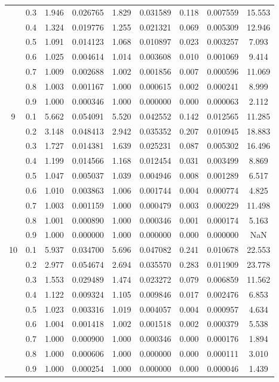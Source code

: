 \begin{longtable}{ | c | c || c | c | c | c | c | c | c | }
 & 0.3 & 1.946 & 0.026765 & 1.829 & 0.031589 & 0.118 & 0.007559 & 15.553 \\
 & 0.4 & 1.324 & 0.019776 & 1.255 & 0.021321 & 0.069 & 0.005309 & 12.946 \\
 & 0.5 & 1.091 & 0.014123 & 1.068 & 0.010897 & 0.023 & 0.003257 & 7.093 \\
 & 0.6 & 1.025 & 0.004614 & 1.014 & 0.003608 & 0.010 & 0.001069 & 9.414 \\
 & 0.7 & 1.009 & 0.002688 & 1.002 & 0.001856 & 0.007 & 0.000596 & 11.069 \\
 & 0.8 & 1.003 & 0.001167 & 1.000 & 0.000615 & 0.002 & 0.000241 & 8.999 \\
 & 0.9 & 1.000 & 0.000346 & 1.000 & 0.000000 & 0.000 & 0.000063 & 2.112 \\
 \hline
\multirow{9}{*}{9} & 0.1 & 5.662 & 0.054091 & 5.520 & 0.042552 & 0.142 & 0.012565 & 11.285 \\
 & 0.2 & 3.148 & 0.048413 & 2.942 & 0.035352 & 0.207 & 0.010945 & 18.883 \\
 & 0.3 & 1.727 & 0.014381 & 1.639 & 0.025231 & 0.087 & 0.005302 & 16.496 \\
 & 0.4 & 1.199 & 0.014566 & 1.168 & 0.012454 & 0.031 & 0.003499 & 8.869 \\
 & 0.5 & 1.047 & 0.005037 & 1.039 & 0.004946 & 0.008 & 0.001289 & 6.517 \\
 & 0.6 & 1.010 & 0.003863 & 1.006 & 0.001744 & 0.004 & 0.000774 & 4.825 \\
 & 0.7 & 1.003 & 0.001159 & 1.000 & 0.000479 & 0.003 & 0.000229 & 11.498 \\
 & 0.8 & 1.001 & 0.000890 & 1.000 & 0.000346 & 0.001 & 0.000174 & 5.163 \\
 & 0.9 & 1.000 & 0.000000 & 1.000 & 0.000000 & 0.000 & 0.000000 & NaN \\
 \hline
\multirow{9}{*}{10} & 0.1 & 5.937 & 0.034700 & 5.696 & 0.047082 & 0.241 & 0.010678 & 22.553 \\
 & 0.2 & 2.977 & 0.054674 & 2.694 & 0.035570 & 0.283 & 0.011909 & 23.778 \\
 & 0.3 & 1.553 & 0.029489 & 1.474 & 0.023272 & 0.079 & 0.006859 & 11.562 \\
 & 0.4 & 1.122 & 0.009324 & 1.105 & 0.009846 & 0.017 & 0.002476 & 6.853 \\
 & 0.5 & 1.023 & 0.003316 & 1.019 & 0.004057 & 0.004 & 0.000957 & 4.634 \\
 & 0.6 & 1.004 & 0.001418 & 1.002 & 0.001518 & 0.002 & 0.000379 & 5.538 \\
 & 0.7 & 1.000 & 0.000900 & 1.000 & 0.000346 & 0.000 & 0.000176 & 1.894 \\
 & 0.8 & 1.000 & 0.000606 & 1.000 & 0.000000 & 0.000 & 0.000111 & 3.010 \\
 & 0.9 & 1.000 & 0.000254 & 1.000 & 0.000000 & 0.000 & 0.000046 & 1.439 \\
 \hline
\hline
\end{longtable}
 
